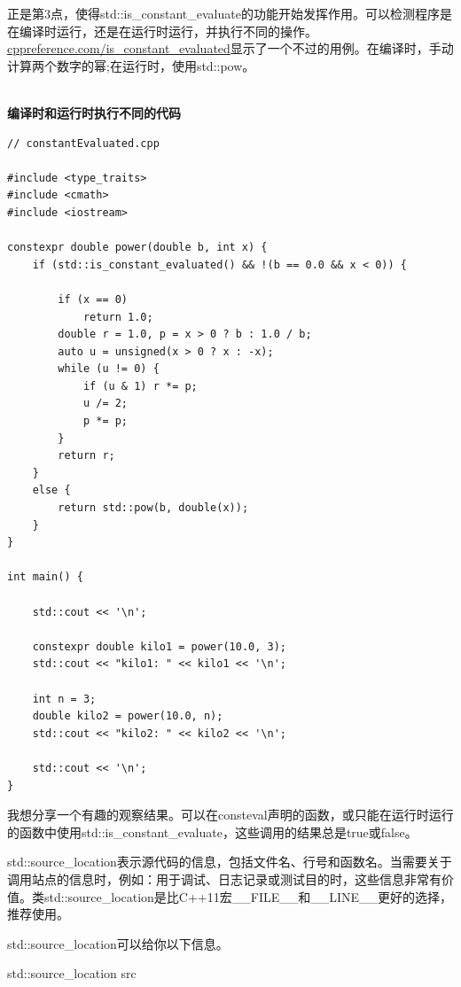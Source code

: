 正是第3点，使得std::is\_constant\_evaluate的功能开始发挥作用。可以检测程序是在编译时运行，还是在运行时运行，并执行不同的操作。\href{https://en.cppreference.com/w/cpp/types/is_constant_evaluated}{cppreference.com/is\_constant\_evaluated}显示了一个不过的用例。在编译时，手动计算两个数字的幂;在运行时，使用std::pow。

\hspace*{\fill} \\ %
\noindent
\textbf{编译时和运行时执行不同的代码}
\begin{lstlisting}[style=styleCXX]
// constantEvaluated.cpp

#include <type_traits>
#include <cmath>
#include <iostream>

constexpr double power(double b, int x) {
	if (std::is_constant_evaluated() && !(b == 0.0 && x < 0)) {
		
		if (x == 0)
			return 1.0;
		double r = 1.0, p = x > 0 ? b : 1.0 / b;
		auto u = unsigned(x > 0 ? x : -x);
		while (u != 0) {
			if (u & 1) r *= p;
			u /= 2;
			p *= p;
		}
		return r;
	}
	else {
		return std::pow(b, double(x));
	}
}

int main() {
	
	std::cout << '\n';
	
	constexpr double kilo1 = power(10.0, 3);
	std::cout << "kilo1: " << kilo1 << '\n';
	
	int n = 3;
	double kilo2 = power(10.0, n);
	std::cout << "kilo2: " << kilo2 << '\n';
	
	std::cout << '\n';
}
\end{lstlisting}

我想分享一个有趣的观察结果。可以在consteval声明的函数，或只能在运行时运行的函数中使用std::is\_constant\_evaluate，这些调用的结果总是true或false。


std::source\_location表示源代码的信息，包括文件名、行号和函数名。当需要关于调用站点的信息时，例如：用于调试、日志记录或测试目的时，这些信息非常有价值。类std::source\_location是比C++11宏\_\_FILE\_\_和\_\_LINE\_\_更好的选择，推荐使用。

std::source\_location可以给你以下信息。

\begin{center}
std::source\_location src
\end{center}

